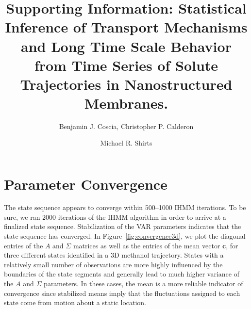 \documentclass{article}
\title{Supporting Information: Statistical Inference of Transport Mechanisms and Long Time Scale Behavior from Time Series 
       of Solute Trajectories in Nanostructured Membranes.}
\author{Benjamin J. Coscia, Christopher P. Calderon \and Michael R. Shirts}
\begin{document}
  \graphicspath{{./supporting_figures/}}
  \maketitle
  \tableofcontents
  
  \section{Parameter Convergence}\label{section:convergence}
  
  The state sequence appears to converge within 500--1000 IHMM iterations. To
  be sure, we ran 2000 iterations of the IHMM algorithm in order to arrive at a 
  finalized state sequence. Stabilization of the VAR parameters indicates 
  that the state sequence has converged. In Figure~\ref{fig:convergence3d}, we plot
  the diagonal entries of the $A$ and $\Sigma$ matrices as well as the entries of
  the mean vector $\mathbf{c}$, for three different states identified in a 3D 
  methanol trajectory. States with a relatively small number of observations are
  more highly influenced by the boundaries of the state segments and generally 
  lead to much higher variance of the $A$ and $\Sigma$ parameters. In these cases,
  the mean is a more reliable indicator of convergence since stabilized means 
  imply that the fluctuations assigned to each state come from motion about a 
  static location.
  
\end{document}
